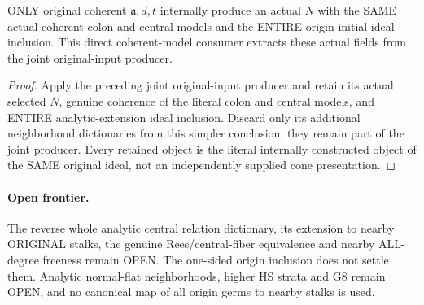 \begin{theorem}
\label{hir:relative-normal-deformation-original-initial-inclusion}
\leanok
{}
ONLY original coherent $\mathfrak a,d,t$ internally produce an actual $N$
with the SAME actual coherent colon and central models and the ENTIRE
origin initial-ideal inclusion. This direct coherent-model consumer
extracts these actual fields from the joint original-input producer.
\end{theorem}
\begin{proof}
Apply the preceding joint original-input producer and retain its actual
selected $N$, genuine coherence of the literal colon and central models,
and ENTIRE analytic-extension ideal inclusion. Discard only its additional
neighborhood dictionaries from this simpler conclusion; they remain part
of the joint producer. Every retained object is the literal internally
constructed object of the SAME original ideal, not an independently supplied
cone presentation.
\end{proof}

\paragraph{Open frontier.}
The reverse whole analytic central relation dictionary, its extension to
nearby ORIGINAL stalks, the genuine Rees/central-fiber equivalence and
nearby ALL-degree freeness remain OPEN. The one-sided origin inclusion
does not settle them. Analytic normal-flat neighborhoods, higher HS strata
and G8 remain OPEN, and no canonical map of all origin germs to nearby
stalks is used.
